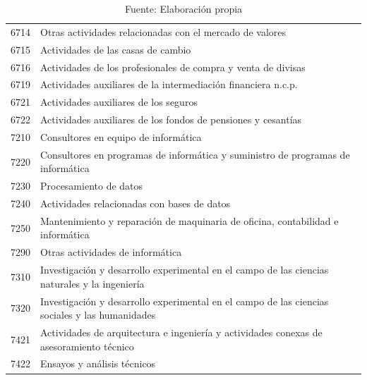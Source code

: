 \documentclass[a4paper]{article}
\begin{document}
\begin{table}[H]
\begin{tabular}{|rl|}
		6714  & Otras actividades relacionadas con el mercado de valores \\
		6715  & Actividades de las casas de cambio \\
		6716  & Actividades de los profesionales de compra y venta de divisas \\
		6719  & Actividades auxiliares de la intermediación financiera n.c.p. \\
		6721  & Actividades auxiliares de los seguros \\
		6722  & Actividades auxiliares de los fondos de pensiones y cesantías \\
		7210  & Consultores en equipo de informática  \\
		7220  & Consultores en programas de informática y suministro de programas de informática \\
		7230  & Procesamiento de datos \\
		7240  & Actividades relacionadas con bases de datos \\
		7250  & Mantenimiento y reparación de maquinaria de oficina, contabilidad e informática \\
		7290  & Otras actividades de informática \\
		7310  & Investigación y desarrollo experimental en el campo de las ciencias naturales y la ingeniería  \\
		7320  & Investigación y desarrollo experimental en el campo de las ciencias sociales y las humanidades  \\
		7421  & Actividades de arquitectura e ingeniería y actividades conexas de asesoramiento técnico \\
		7422  & Ensayos y análisis técnicos \\
		\bottomrule
	\end{tabular}
    \caption*{Fuente: Elaboración propia}
	\label{tab:profesiones}
\end{table}  
\end{document}
